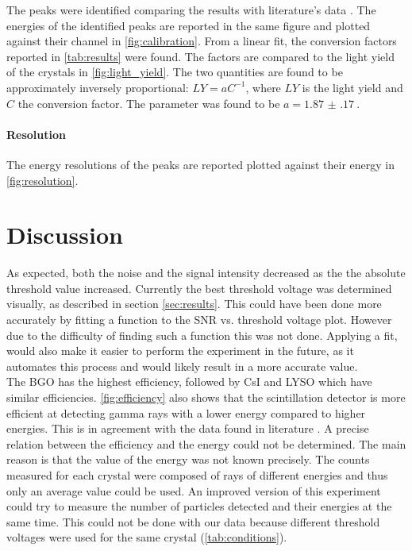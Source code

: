 \documentclass[a4paper, 11pt, table]{article}
\begin{document}
The peaks were identified comparing the results with literature's data \cite{heath_scintillation_1964}. The energies of the identified peaks are reported in the same figure and plotted against their channel in \cref{fig:calibration}. From a linear fit, the conversion factors reported in \cref{tab:results} were found. The factors are compared to the light yield of the crystals in \cref{fig:light_yield}. The two quantities are found to be approximately inversely proportional: $LY = aC^{-1}$, where $LY$ is the light yield and $C$ the conversion factor. The parameter was found to be $a = \SI{1.87(17)}{}$.

\paragraph{Resolution} The energy resolutions of the peaks are reported plotted against their energy in \cref{fig:resolution}.

\newpage
\section{Discussion}
As expected, both the noise and the signal intensity decreased as the the absolute threshold value increased. Currently the best threshold voltage was determined visually, as described in section \ref{sec:results}. This could have been done more accurately  by fitting a function to the SNR vs. threshold voltage plot. However due to the difficulty of finding such a function this was not done. Applying a fit, would also make it easier to perform the experiment in the future, as it automates this process and would likely result in a more accurate value.\\

The BGO has the highest efficiency, followed by CsI and LYSO which have similar efficiencies. \cref{fig:efficiency} also shows that the scintillation detector is more efficient at detecting gamma rays with a lower energy compared to higher energies. This is in agreement with the data found in literature \cite{Grodzicka_2013, jeong_development_2020}. A precise relation between the efficiency and the energy could not be determined. The main reason is that the value of the energy was not known precisely. The counts measured for each crystal were composed of rays of different energies and thus only an average value could be used. An improved version of this experiment could try to measure the number of particles detected and their energies at the same time. This could not be done with our data because different threshold voltages were used for the same crystal (\cref{tab:conditions}).\\
\end{document}

